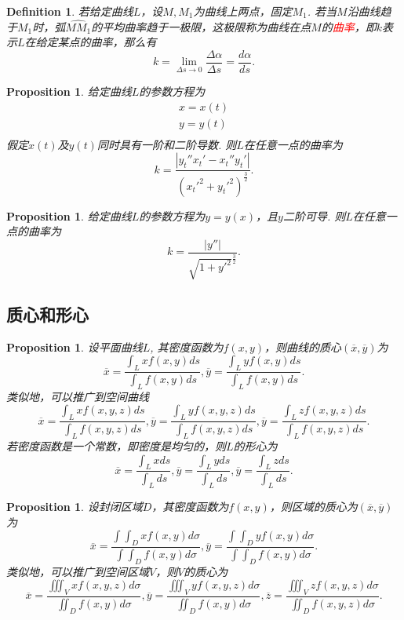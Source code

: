 \documentclass{article}
\newtheorem{proposition}[theorem]{Proposition}
\newtheorem{definition}[theorem]{Definition}
\newcommand{\redt}[1]{\textcolor{red}{#1}}
\begin{document}
\begin{definition}
\rm 若给定曲线$L$，设$M,M_1$为曲线上两点，固定$M_1$. 若当$M$沿曲线趋于$M_1$时，弧$\widehat{MM_1}$的平均曲率趋于一极限，这极限称为曲线在点$M$的\redt{曲率}，即$k$表示$L$在给定某点的曲率，那么有
$$
k =  \lim\limits_{\Delta s \to 0} \frac{\Delta \alpha}{\Delta s} = \frac{d\alpha}{ds}.
$$ 
\end{definition}

\begin{proposition}
\rm 给定曲线$L$的参数方程为
$$
\begin{array}{ll}
x = x(t) \\
y = y(t) \\
\end{array}
$$
假定$x(t)$及$y(t)$同时具有一阶和二阶导数. 则$L$在任意一点的曲率为
$$
k = \frac{|y_t''x_t'-x_t''y_t'|}{(x_t'^2 + y_t'^2)^{\frac{3}{2}}}.
$$
\end{proposition}

\begin{proposition}
\rm 给定曲线$L$的参数方程为$y=y(x)$，且$y$二阶可导. 则$L$在任意一点的曲率为
$$
k = \frac{|y''|}{\sqrt{1+y'^2}^{\frac{3}{2}}}.
$$
\end{proposition}


\subsection{质心和形心}

\begin{proposition}
\rm 设平面曲线$L$, 其密度函数为$f(x,y)$，则曲线的质心$(\overline{x},\overline{y})$为
$$
\overline{x} = \frac{\int_L xf(x,y)ds}{\int_L f(x,y)ds}, \overline{y} = \frac{\int_L yf(x,y)ds}{\int_L f(x,y)ds}.
$$
类似地，可以推广到空间曲线
$$
\overline{x} = \frac{\int_L xf(x,y,z)ds}{\int_L f(x,y,z)ds}, \overline{y} = \frac{\int_L yf(x,y,z)ds}{\int_L f(x,y,z)ds},
\overline{y} = \frac{\int_L zf(x,y,z)ds}{\int_L f(x,y,z)ds}.
$$
若密度函数是一个常数，即密度是均匀的，则$L$的形心为
$$
\overline{x} = \frac{\int_L xds}{\int_L ds}, \overline{y} = \frac{\int_L yds}{\int_L ds},
\overline{y} = \frac{\int_L zds}{\int_L ds}.
$$
\end{proposition}

\begin{proposition}
\rm 设封闭区域$D$，其密度函数为$f(x,y)$，则区域的质心为$(\overline{x},\overline{y})$为
$$
\overline{x} = \frac{\int\int_D xf(x,y)d\sigma}{\int\int_D f(x,y)d\sigma}, \overline{y} = \frac{\int\int_D yf(x,y)d\sigma}{\int\int_D f(x,y)d\sigma}.
$$
类似地，可以推广到空间区域$V$，则$V$的质心为
$$
\overline{x} = \frac{\iiint_V xf(x,y,z)d\sigma}{\iint_D f(x,y)d\sigma}, 
\overline{y} = \frac{\iiint_V yf(x,y,z)d\sigma}{\iint_D f(x,y)d\sigma},
\overline{z} = \frac{\iiint_V zf(x,y,z)d\sigma}{\iint_D f(x,y,z)d\sigma}.
$$
\end{proposition}
\end{document}
